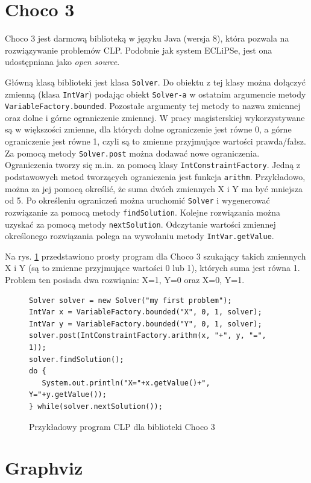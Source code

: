 \section{Choco 3}


Choco 3 \cite{Choco3} jest darmową biblioteką w języku Java (wersja 8), która pozwala na rozwiązywanie problemów CLP. Podobnie jak system ECLiPSe, jest ona udostępniana jako \textit{open source}.

Główną klasą biblioteki jest klasa \texttt{Solver}. Do obiektu z tej klasy  można dołączyć zmienną (klasa \texttt{IntVar}) podając obiekt \texttt{Solver-a} w ostatnim argumencie metody \texttt{VariableFactory.bounded}. Pozostałe argumenty tej metody to nazwa zmiennej oraz dolne i górne ograniczenie zmiennej. W pracy magisterskiej wykorzystywane są w większości zmienne, dla których dolne ograniczenie jest równe 0, a górne ograniczenie jest równe 1, czyli są to zmienne przyjmujące wartości prawda/fałsz. Za pomocą metody \texttt{Solver.post} można dodawać nowe ograniczenia. Ograniczenia tworzy się m.in. za pomocą klasy \texttt{IntConstraintFactory}. Jedną z podstawowych metod tworzących ograniczenia jest funkcja \texttt{arithm}. Przykładowo, można za jej pomocą określić, że suma dwóch zmiennych X i Y ma być mniejsza od 5. Po określeniu ograniczeń można uruchomić \texttt{Solver} i wygenerować rozwiązanie za pomocą metody \texttt{findSolution}. Kolejne rozwiązania można uzyskać za pomocą metody \texttt{nextSolution}. Odczytanie wartości zmiennej określonego rozwiązania polega na wywołaniu metody \texttt{IntVar.getValue}. 

Na rys. \ref{fig:choco} przedstawiono prosty program dla Choco 3 szukający takich zmiennych X i Y (są to zmienne przyjmujące wartości 0 lub 1), których suma jest równa 1. Problem ten posiada dwa rozwiąnia: X=1, Y=0 oraz X=0, Y=1.

\begin{figure}
\begin{verbatim}
Solver solver = new Solver("my first problem");
IntVar x = VariableFactory.bounded("X", 0, 1, solver);
IntVar y = VariableFactory.bounded("Y", 0, 1, solver);
solver.post(IntConstraintFactory.arithm(x, "+", y, "=", 1));
solver.findSolution();
do {
   System.out.println("X="+x.getValue()+", Y="+y.getValue());
} while(solver.nextSolution());
\end{verbatim}
\caption{Przykładowy program CLP dla biblioteki Choco 3}
\label{fig:choco}
\end{figure}

\section{Graphviz}

